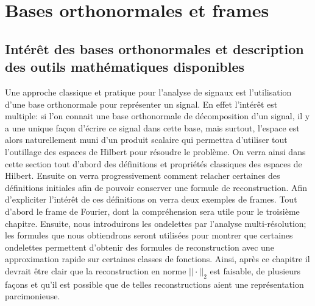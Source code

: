 \section{Bases orthonormales et frames}
\subsection{Intérêt des bases orthonormales et description des outils mathématiques disponibles}
Une approche classique et pratique pour l'analyse de signaux est l'utilisation d'une base orthonormale pour représenter un signal. 
En effet l'intérêt est multiple: si l'on connait une base orthonormale de décomposition d'un signal, il y a une unique façon d'écrire ce signal dans cette base, mais surtout, l'espace est alors naturellement muni d'un produit scalaire qui permettra d'utiliser tout l'outillage des espaces de Hilbert pour résoudre le problème.
\newline
On verra ainsi dans cette section tout d'abord des définitions et propriétés classiques des espaces de Hilbert. 
Ensuite on verra progressivement comment relacher certaines des définitions initiales afin de pouvoir conserver une formule de reconstruction.
Afin d'expliciter l'intérêt de ces définitions on verra deux exemples de frames.
Tout d'abord le frame de Fourier, dont la compréhension sera utile pour le troisième chapitre.
Ensuite, nous introduirons les ondelettes par l'analyse multi-résolution; les formules que nous obtiendrons seront utilisées pour montrer que certaines ondelettes permettent d'obtenir des formules de reconstruction avec une approximation rapide sur certaines classes de fonctions.
Ainsi, après ce chapitre il devrait être clair que la reconstruction en norme $||\cdot||_2$ est faisable, de plusieurs façons et qu'il est possible que de telles reconstructions aient une représentation parcimonieuse.
